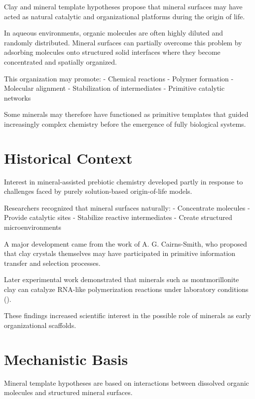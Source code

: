 \documentclass[
  oneside]{book}
\begin{document}
Clay and mineral template hypotheses propose that mineral surfaces may have acted as natural catalytic and organizational platforms during the origin of life.

In aqueous environments, organic molecules are often highly diluted and randomly distributed. Mineral surfaces can partially overcome this problem by adsorbing molecules onto structured solid interfaces where they become concentrated and spatially organized.

This organization may promote:
- Chemical reactions
- Polymer formation
- Molecular alignment
- Stabilization of intermediates
- Primitive catalytic networks

Some minerals may therefore have functioned as primitive templates that guided increasingly complex chemistry before the emergence of fully biological systems.

\section{Historical Context}\label{historical-context-5}

Interest in mineral-assisted prebiotic chemistry developed partly in response to challenges faced by purely solution-based origin-of-life models.

Researchers recognized that mineral surfaces naturally:
- Concentrate molecules
- Provide catalytic sites
- Stabilize reactive intermediates
- Create structured microenvironments

A major development came from the work of A. G. Cairns-Smith, who proposed that clay crystals themselves may have participated in primitive information transfer and selection processes.

Later experimental work demonstrated that minerals such as montmorillonite clay can catalyze RNA-like polymerization reactions under laboratory conditions ().

These findings increased scientific interest in the possible role of minerals as early organizational scaffolds.

\section{Mechanistic Basis}\label{mechanistic-basis-5}

Mineral template hypotheses are based on interactions between dissolved organic molecules and structured mineral surfaces.
\end{document}
